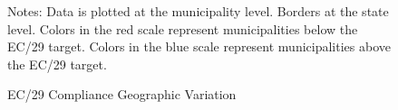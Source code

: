 \begin{figure}[h!]
\begin{center}
    \caption{EC/29 Compliance Geographic Variation}
\end{center}
\scriptsize{Notes: Data is plotted at the municipality level. Borders at the state level. Colors in the red scale represent municipalities below the EC/29 target. Colors in the blue scale represent municipalities above the EC/29 target.}
\end{figure}